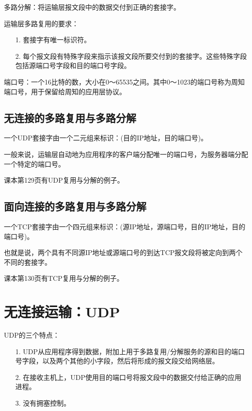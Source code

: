 \documentclass[a4paper,left=2.5cm,right=2.5cm,11pt]{article}
\begin{document}
	多路分解：将运输层报文段中的数据交付到正确的套接字。\par

	运输层多路复用的要求：
	\begin{itemize}
		\item[1.] 套接字有唯一标识符。
		\item[2.] 每个报文段有特殊字段来指示该报文段所要交付到的套接字。这些特殊字段包括源端口号字段和目的端口号字段。
	\end{itemize}

	端口号：一个16比特的数，大小在0～65535之间。其中0～1023的端口号称为周知端口号，用于保留给周知的应用层协议。

\subsection{无连接的多路复用与多路分解}
	一个UDP套接字由一个二元组来标识：(目的IP地址，目的端口号)。\par

	一般来说，运输层自动地为应用程序的客户端分配唯一的端口号，为服务器端分配一个特定的端口号。\par

	课本第129页有UDP复用与分解的例子。

\subsection{面向连接的多路复用与多路分解}
	一个TCP套接字由一个四元组来标识：(源IP地址，源端口号，目的IP地址，目的端口号)。\par

	也就是说，两个具有不同源IP地址或源端口号的到达TCP报文段将被定向到两个不同的套接字。\par

	课本第130页有TCP复用与分解的例子。

\section{无连接运输：UDP}
	UDP的三个特点：
	\begin{itemize}
		\item[1.] UDP从应用程序得到数据，附加上用于多路复用/分解服务的源和目的端口号字段，以及两个其他的小字段，然后将形成的报文段交给网络层。
		\item[2.] 在接收主机上，UDP使用目的端口号将报文段中的数据交付给正确的应用进程。
		\item[3.] 没有拥塞控制。
	\end{itemize}
\end{document}
